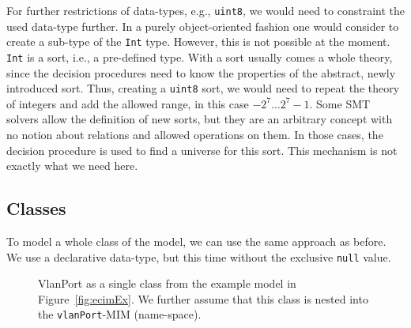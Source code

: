 For further restrictions of data-types, e.g., \verb|uint8|, we would need to constraint the used data-type further. In a purely object-oriented fashion one would consider to create a sub-type of the \verb|Int| type. However, this is not possible at the moment. \verb|Int| is a sort, i.e., a pre-defined type. With a sort usually comes a whole theory, since the decision procedures need to know the properties of the abstract, newly introduced sort. Thus, creating a \verb|uint8| sort, we would need to repeat the theory of integers and add the allowed range, in this case $-2^7 \ldots 2^7 - 1$. 
Some SMT solvers allow the definition of new sorts, but they are an arbitrary concept with no notion about relations and allowed operations on them. In those cases, the decision procedure is used to find a universe for this sort. This mechanism is not exactly what we need here. \\


\subsection*{Classes}
To model a whole class of the model, we can use the same approach as before. We use a declarative data-type, but this time without the exclusive \verb|null| value. \\

\begin{figure}[htb]
\centering
{}
\caption[\textsf{VlanPort} class]{\textsf{VlanPort} as a single class from the example model in Figure~\ref{fig:ecimEx}. We further assume that this class is nested into the \texttt{vlanPort}-MIM (name-space).}
\label{fig:singleClass}
\end{figure}

